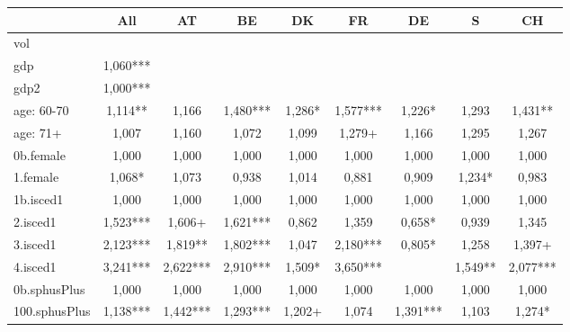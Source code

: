 {
\def\sym#1{\ifmmode^{#1}\else\(^{#1}\)\fi}
\begin{tabular}{l*{8}{c}}
\hline\hline
            &\multicolumn{1}{c}{All}&\multicolumn{1}{c}{AT}&\multicolumn{1}{c}{BE}&\multicolumn{1}{c}{DK}&\multicolumn{1}{c}{FR}&\multicolumn{1}{c}{DE}&\multicolumn{1}{c}{S}&\multicolumn{1}{c}{CH}\\
\hline
vol         &               &               &               &               &               &               &               &               \\
gdp         &       1,060***&               &               &               &               &               &               &               \\
gdp2        &       1,000***&               &               &               &               &               &               &               \\
age: 60-70  &       1,114** &       1,166   &       1,480***&       1,286*  &       1,577***&       1,226*  &       1,293   &       1,431** \\
age: 71+    &       1,007   &       1,160   &       1,072   &       1,099   &       1,279+  &       1,166   &       1,295   &       1,267   \\
0b.female   &       1,000   &       1,000   &       1,000   &       1,000   &       1,000   &       1,000   &       1,000   &       1,000   \\
1.female    &       1,068*  &       1,073   &       0,938   &       1,014   &       0,881   &       0,909   &       1,234*  &       0,983   \\
1b.isced1   &       1,000   &       1,000   &       1,000   &       1,000   &       1,000   &       1,000   &       1,000   &       1,000   \\
2.isced1    &       1,523***&       1,606+  &       1,621***&       0,862   &       1,359   &       0,658*  &       0,939   &       1,345   \\
3.isced1    &       2,123***&       1,819** &       1,802***&       1,047   &       2,180***&       0,805*  &       1,258   &       1,397+  \\
4.isced1    &       3,241***&       2,622***&       2,910***&       1,509*  &       3,650***&               &       1,549** &       2,077***\\
0b.sphusPlus&       1,000   &       1,000   &       1,000   &       1,000   &       1,000   &       1,000   &       1,000   &       1,000   \\
100.sphusPlus&       1,138***&       1,442***&       1,293***&       1,202+  &       1,074   &       1,391***&       1,103   &       1,274*  \\

\end{tabular}}
